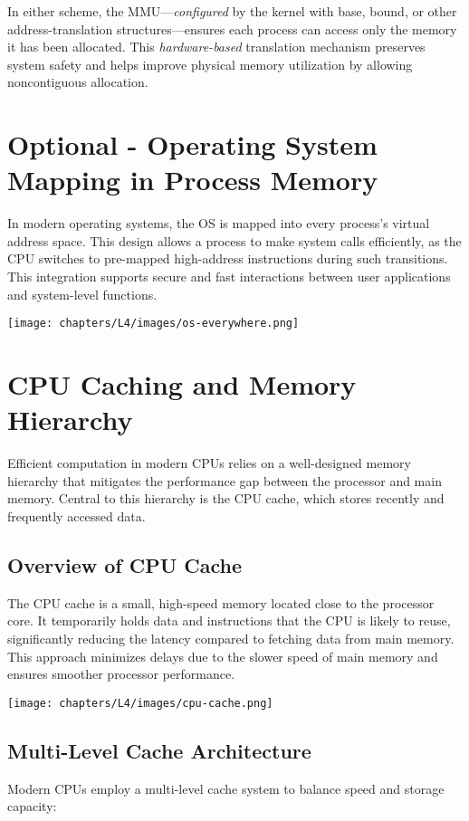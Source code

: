 \documentclass[../../compsys.tex]{subfiles}
\begin{document}
\noindent In either scheme, the MMU---\emph{configured} by the kernel with base, bound, or other address-translation structures---ensures each process can access only the memory it has been allocated. This \emph{hardware-based} translation mechanism preserves system safety and helps improve physical memory utilization by allowing noncontiguous allocation.
\newpage
\section{Optional - Operating System Mapping in Process Memory}
In modern operating systems, the OS is mapped into every process's virtual address space. This design allows a process to make system calls efficiently, as the CPU switches to pre-mapped high-address instructions during such transitions. This integration supports secure and fast interactions between user applications and system-level functions.

\begin{center}
  \texttt{[image: chapters/L4/images/os-everywhere.png]}
\end{center}

\section{CPU Caching and Memory Hierarchy}
Efficient computation in modern CPUs relies on a well-designed memory hierarchy that mitigates the performance gap between the processor and main memory. Central to this hierarchy is the CPU cache, which stores recently and frequently accessed data.

\subsection{Overview of CPU Cache}
The CPU cache is a small, high-speed memory located close to the processor core. It temporarily holds data and instructions that the CPU is likely to reuse, significantly reducing the latency compared to fetching data from main memory. This approach minimizes delays due to the slower speed of main memory and ensures smoother processor performance.
\begin{center}
  \texttt{[image: chapters/L4/images/cpu-cache.png]}
\end{center}

\subsection{Multi-Level Cache Architecture}
Modern CPUs employ a multi-level cache system to balance speed and storage capacity:
\end{document}
